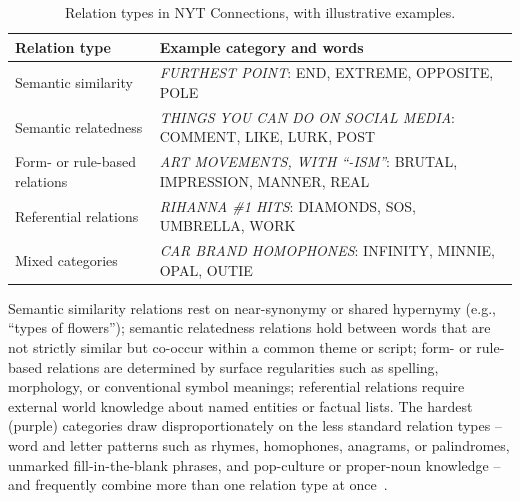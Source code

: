 \begin{table}[htbp]
  \centering
  \caption{Relation types in NYT Connections, with illustrative examples.}
  \label{tab:relation-types}
  \begin{tabular}{@{}p{}p{}@{}}
    \toprule
    \textbf{Relation type} & \textbf{Example category and words} \\
    \midrule
    Semantic similarity &
      \textit{FURTHEST POINT}: END, EXTREME, OPPOSITE, POLE~\cite{nyt-puzzle-2026-01-05} \\
    Semantic relatedness &
      \textit{THINGS YOU CAN DO ON SOCIAL MEDIA}: COMMENT, LIKE, LURK, POST~\cite{nyt-puzzle-2026-01-05} \\
    Form- or rule-based relations &
      \textit{ART MOVEMENTS, WITH ``-ISM''}: BRUTAL, IMPRESSION, MANNER, REAL~\cite{nyt-puzzle-2026-01-05} \\
    Referential relations &
      \textit{RIHANNA \#1 HITS}: DIAMONDS, SOS, UMBRELLA, WORK~\cite{nyt-puzzle-2026-01-03} \\
    Mixed categories &
      \textit{CAR BRAND HOMOPHONES}: INFINITY, MINNIE, OPAL, OUTIE~\cite{nyt-puzzle-2025-12-29} \\
    \bottomrule
  \end{tabular}
\end{table}

Semantic similarity relations rest on near-synonymy or shared hypernymy
(e.g., ``types of flowers''); semantic relatedness relations hold between
words that are not strictly similar but co-occur within a common theme or
script; form- or rule-based relations are determined by surface
regularities such as spelling, morphology, or conventional symbol
meanings; referential relations require external world knowledge about
named entities or factual lists. The hardest (purple) categories draw
disproportionately on the less standard relation types -- word and letter
patterns such as rhymes, homophones, anagrams, or palindromes, unmarked
fill-in-the-blank phrases, and pop-culture or proper-noun knowledge -- and
frequently combine more than one relation type at once~\cite{nyt-tips-tricks-2023}.

